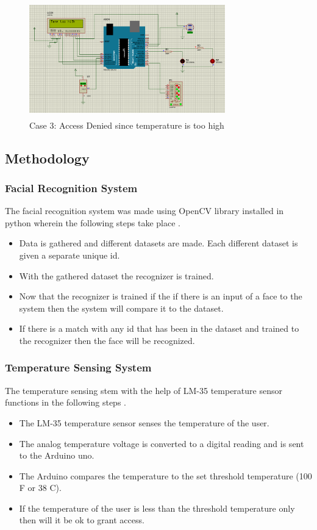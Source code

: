 \documentclass[conference]{IEEEtran}
\begin{document}
	\begin{figure}
		\centering
		\includegraphics[width=8.5cm, height=5cm]{ProtC3.png}
		\caption{\label{fig:The-caption}Case 3: Access Denied since temperature is too high}
	\end{figure}
	\subsection{Methodology}
	\subsubsection{Facial Recognition System}
	The facial recognition system was made using OpenCV library installed in python wherein the following steps take place \cite{g}.
	\begin{itemize}
		\item Data is gathered and different datasets are made. Each different dataset is given a separate unique id.
		\item With the gathered dataset the recognizer is trained.
		\item Now that the recognizer is trained if the if there is
		an input of a face to the system then the system
		will compare it to the dataset.
		\item If there is a match with any id that has been in the dataset and trained to the recognizer then the face
		will be recognized.\\
	\end{itemize}
	\subsubsection{Temperature Sensing System}
	The temperature sensing
	stem with the help of LM-35 temperature sensor functions
	in the following steps \cite{i}.
	\begin{itemize}
		\item The LM-35 temperature sensor senses the
		temperature of the user.
		\item The analog temperature voltage is converted to a
		digital reading and is sent to the Arduino uno.
		\item The Arduino compares the temperature to the set
		threshold temperature (100 F or 38 C).
		\item If the temperature of the user is less than the
		threshold temperature only then will it be ok to
		grant access.\\
	\end{itemize}
\end{document}
